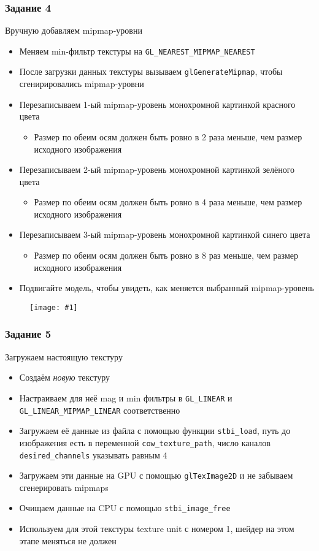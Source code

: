 \documentclass{beamer}
\newcommand{\slideimage}[1]{
  \begin{figure}
    \begin{adjustbox}{width=\textwidth, totalheight=\textheight-2\baselineskip-2\baselineskip,keepaspectratio}
      \texttt{[image: \#1]}
    \end{adjustbox}
  \end{figure}
}
\begin{document}
\begin{frame}[fragile]
\frametitle{Задание 4}
Вручную добавляем mipmap-уровни
\begin{itemize}
\item Меняем min-фильтр текстуры на \verb|GL_NEAREST_MIPMAP_NEAREST|
\item После загрузки данных текстуры вызываем \verb|glGenerateMipmap|, чтобы сгенирировались mipmap-уровни
\item Перезаписываем 1-ый mipmap-уровень монохромной картинкой красного цвета
\begin{itemize}
\item Размер по обеим осям должен быть ровно в 2 раза меньше, чем размер исходного изображения
\end{itemize}
\item Перезаписываем 2-ый mipmap-уровень монохромной картинкой зелёного цвета
\begin{itemize}
\item Размер по обеим осям должен быть ровно в 4 раза меньше, чем размер исходного изображения
\end{itemize}
\item Перезаписываем 3-ый mipmap-уровень монохромной картинкой синего цвета
\begin{itemize}
\item Размер по обеим осям должен быть ровно в 8 раз меньше, чем размер исходного изображения
\end{itemize}
\item Подвигайте модель, чтобы увидеть, как меняется выбранный mipmap-уровень
\end{itemize}
\end{frame}

\begin{frame}[fragile]
\slideimage{4.png}
\end{frame}

\begin{frame}[fragile]
\frametitle{Задание 5}
Загружаем настоящую текстуру
\begin{itemize}
\item Создаём \textit{новую} текстуру
\item Настраиваем для неё mag и min фильтры в \verb|GL_LINEAR| и \verb|GL_LINEAR_MIPMAP_LINEAR| соответственно
\item Загружаем её данные из файла с помощью функции \verb|stbi_load|, путь до изображения есть в переменной \verb|cow_texture_path|, число каналов \verb|desired_channels| указывать равным 4
\item Загружаем эти данные на GPU с помощью \verb|glTexImage2D| и не забываем сгенерировать mipmaps
\item Очищаем данные на CPU с помощью \verb|stbi_image_free|
\item Используем для этой текстуры texture unit с номером 1, шейдер на этом этапе меняться не должен
\end{itemize}
\end{frame}
\end{document}
